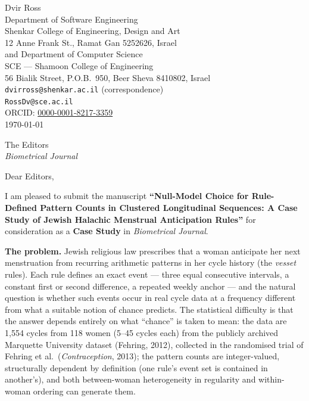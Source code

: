 \documentclass[11pt]{article}
\begin{document}
\begin{flushright}
Dvir Ross\\
Department of Software Engineering\\
Shenkar College of Engineering, Design and Art\\
12 Anne Frank St., Ramat Gan 5252626, Israel\\[2pt]
and Department of Computer Science\\
SCE --- Shamoon College of Engineering\\
56 Bialik Street, P.O.B.\ 950, Beer Sheva 8410802, Israel\\[2pt]
\texttt{dvirross@shenkar.ac.il} (correspondence)\\
\texttt{RossDv@sce.ac.il}\\
ORCID: \href{https://orcid.org/0000-0001-8217-3359}{0000-0001-8217-3359}\\[6pt]
\today
\end{flushright}

\bigskip

The Editors\\
\textit{Biometrical Journal}

\bigskip

Dear Editors,

\medskip

I am pleased to submit the manuscript \textbf{``Null-Model Choice for Rule-Defined
Pattern Counts in Clustered Longitudinal Sequences: A Case Study of Jewish Halachic
Menstrual Anticipation Rules''} for consideration as a \textbf{Case Study} in
\textit{Biometrical Journal}.

\medskip
\textbf{The problem.}
Jewish religious law prescribes that a woman anticipate her next menstruation from
recurring arithmetic patterns in her cycle history (the \textit{vesset} rules). Each rule
defines an exact event --- three equal consecutive intervals, a constant first or second
difference, a repeated weekly anchor --- and the natural question is whether such events
occur in real cycle data at a frequency different from what a suitable notion of chance
predicts. The
statistical difficulty is that the answer depends entirely on what ``chance'' is taken
to mean: the data are 1,554 cycles from 118 women (5--45 cycles each) from the publicly
archived Marquette University dataset (Fehring, 2012), collected in the randomised trial
of Fehring et al.\ (\textit{Contraception}, 2013); the pattern counts are integer-valued, structurally
dependent by definition (one rule's event set is contained in another's), and both
between-woman heterogeneity in regularity and within-woman ordering can generate them.
\end{document}
